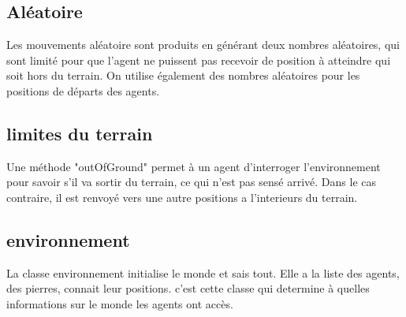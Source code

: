 \subsection{Aléatoire}
Les mouvements aléatoire sont produits en générant deux nombres
aléatoires, qui sont limité pour que l'agent ne puissent pas recevoir
de position à atteindre qui soit hors du terrain.  On utilise
également des nombres aléatoires pour les positions de départs des
agents.

\subsection{limites du terrain}

Une méthode "outOfGround" permet à un agent d'interroger
l'environnement pour savoir s'il va sortir du terrain, ce qui n'est
pas sensé arrivé. Dans le cas contraire, il est renvoyé vers une autre
positions a l'interieurs du terrain.

\subsection{environnement}
La classe environnement initialise le monde et sais tout. Elle a la liste des 
agents, des pierres, connait leur positions. c'est cette classe qui determine à quelles informations sur le monde les agents ont accès.
